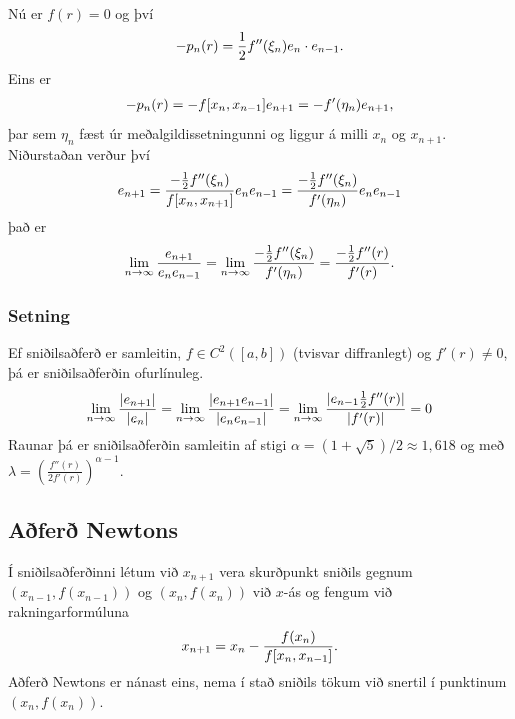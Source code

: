 \documentclass[a4paper,10pt,icelandic]{sphinxmanual}
\begin{document}
Nú er \(f(r) = 0\) og því
\begin{gather}
\begin{split}-p_n(r) = \frac{1}{2}f''(\xi_n)e_n\cdot e_{n-1}.\end{split}\notag
\end{gather}
Eins er
\begin{gather}
\begin{split}-p_n(r) = -f[x_n,x_{n-1}]e_{n+1}=-f'(\eta_n)e_{n+1},\end{split}\notag
\end{gather}
þar sem \(\eta_n\) fæst úr meðalgildissetningunni og liggur á milli
\(x_n\) og \(x_{n+1}\). Niðurstaðan verður því
\begin{gather}
\begin{split}e_{n+1} = \frac{-\frac{1}{2}f''(\xi_n)}
        {f[x_n, x_{n+1}]}
    e_ne_{n-1} = \frac{-\frac{1}{2}f''(\xi_n)}
        {f'(\eta_n)}e_ne_{n-1}\end{split}\notag
\end{gather}
það er
\begin{gather}
\begin{split}\lim_{n\to \infty}\dfrac{e_{n+1}}{e_ne_{n-1}}=
\lim_{n \to \infty} \frac{-\frac{1}{2}f''(\xi_n)}
        {f'(\eta_n)}
=
\frac{-\frac{1}{2}f''(r)}
        {f'(r)}.\end{split}\notag
\end{gather}

\subsubsection{Setning}
\label{kafli02:id3}
Ef sniðilsaðferð er samleitin, \(f\in C^2([a,b])\) (tvisvar
diffranlegt) og \(f'(r)\neq 0\), þá er sniðilsaðferðin ofurlínuleg.
\begin{gather}
\begin{split}\lim_{n\to \infty}\dfrac{|e_{n+1}|}{|e_n|} =
\lim_{n\to \infty}\dfrac{|e_{n+1}e_{n-1}|}{|e_ne_{n-1}|}=
\lim_{n \to \infty} \frac{|e_{n-1}\frac{1}{2}f''(r)|}
        {|f'(r)|} = 0\end{split}\notag
\end{gather}
Raunar þá er sniðilsaðferðin samleitin af stigi
\(\alpha = (1+\sqrt 5)/2 \approx 1,618\) og með
\(\lambda = \left(\frac{f''(r)}{2f'(r)}\right)^{\alpha -1}\).


\subsection{Aðferð Newtons}
\label{kafli02:index-6}\label{kafli02:afer-newtons}
Í sniðilsaðferðinni létum við \(x_{n+1}\) vera skurðpunkt sniðils
gegnum \((x_{n-1},f(x_{n-1}))\) og \((x_n,f(x_n))\) við
\(x\)-ás og fengum við rakningarformúluna
\begin{gather}
\begin{split}x_{n+1} = x_n - \frac{f(x_n)}{f[x_n,x_{n-1}]}.\end{split}\notag
\end{gather}
Aðferð Newtons er nánast eins, nema í stað sniðils tökum við snertil í
punktinum \((x_n,f(x_n))\).
\end{document}
